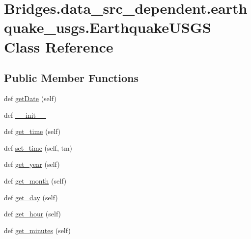 \hypertarget{class_bridges_1_1data__src__dependent_1_1earthquake__usgs_1_1_earthquake_u_s_g_s}{}\section{Bridges.\+data\+\_\+src\+\_\+dependent.\+earthquake\+\_\+usgs.\+Earthquake\+U\+S\+G\+S Class Reference}
\label{class_bridges_1_1data__src__dependent_1_1earthquake__usgs_1_1_earthquake_u_s_g_s}
\subsection*{Public Member Functions}
\begin{DoxyCompactItemize}
\item 
def \hyperlink{class_bridges_1_1data__src__dependent_1_1earthquake__usgs_1_1_earthquake_u_s_g_s_ac8faae507fb0bc1b2770237728e0b717}{get\+Date} (self)
\item 
def \hyperlink{class_bridges_1_1data__src__dependent_1_1earthquake__usgs_1_1_earthquake_u_s_g_s_a3c286ff8f46e62abf553d5263cfeef45}{\+\_\+\+\_\+init\+\_\+\+\_\+}
\item 
def \hyperlink{class_bridges_1_1data__src__dependent_1_1earthquake__usgs_1_1_earthquake_u_s_g_s_a0caa0f948495df9f6f4b7c73b3f1061d}{get\+\_\+time} (self)
\item 
def \hyperlink{class_bridges_1_1data__src__dependent_1_1earthquake__usgs_1_1_earthquake_u_s_g_s_a6c306016619d12163105c698e2a69e46}{set\+\_\+time} (self, tm)
\item 
def \hyperlink{class_bridges_1_1data__src__dependent_1_1earthquake__usgs_1_1_earthquake_u_s_g_s_a6698064eb1f56513487e0facbadbd825}{get\+\_\+year} (self)
\item 
def \hyperlink{class_bridges_1_1data__src__dependent_1_1earthquake__usgs_1_1_earthquake_u_s_g_s_a552c9a756e348c4a9fa1fcbed04eee8b}{get\+\_\+month} (self)
\item 
def \hyperlink{class_bridges_1_1data__src__dependent_1_1earthquake__usgs_1_1_earthquake_u_s_g_s_a57b9204980b30b36c9e3bca9f7e621aa}{get\+\_\+day} (self)
\item 
def \hyperlink{class_bridges_1_1data__src__dependent_1_1earthquake__usgs_1_1_earthquake_u_s_g_s_a34618ad50c8d66034237fdd055d2c7b8}{get\+\_\+hour} (self)
\item 
def \hyperlink{class_bridges_1_1data__src__dependent_1_1earthquake__usgs_1_1_earthquake_u_s_g_s_a51747d87e6a3ee84aa183106cd3f3a71}{get\+\_\+minutes} (self)

\end{DoxyCompactItemize}
